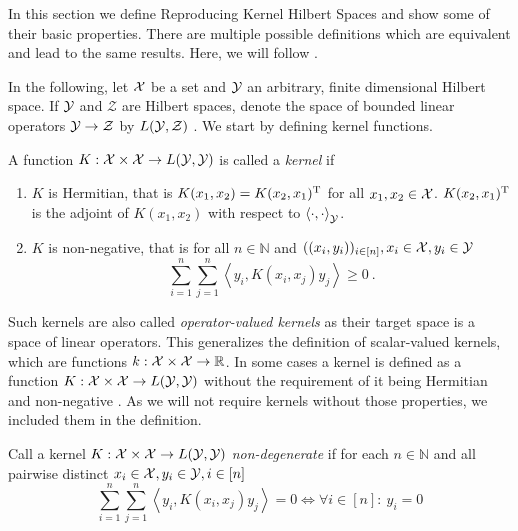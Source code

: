 In this section we define Reproducing Kernel Hilbert Spaces and show some of their basic properties.
There are multiple possible definitions which are equivalent and lead to the same results.
Here, we will follow \cite{owhadi20}.


In the following, let $\mathcal{X}$ be a set and $\mathcal{Y}$ an arbitrary, finite dimensional Hilbert space.
If $\mathcal{Y}$ and $\mathcal{Z}$ are Hilbert spaces, denote the space of bounded linear operators $\mathcal{Y} \rightarrow \mathcal{Z}$ by $L(\mathcal{Y}, \mathcal{Z})$ .
We start by defining kernel functions.
\begin{definition}
	\label{def:kernel}
	A function $K: \mathcal{X} \times \mathcal{X} \rightarrow L(\mathcal{Y}, \mathcal{Y})$ is called a \emph{kernel} if
	\begin{enumerate}
		\item $K$ is Hermitian, that is $K(x_1, x_2) = K(x_2, x_1)^{\mathrm{T}}$ for all $x_1, x_2 \in \mathcal{X}$. 
		$K(x_2, x_1)^{\mathrm{T}}$ is the adjoint of $K(x_1, x_2)$ with respect to $\left<\cdot, \cdot\right>_{\mathcal{Y}}$.
		\item $K$ is non-negative, that is for all $n \in \mathbb{N}$ and $((x_i, y_i))_{i \in [n]}, x_i \in \mathcal{X}, y_i \in \mathcal{Y}$
		\begin{equation}
			\sum_{i=1}^n \sum_{j=1}^n \left< y_i, K(x_i, x_j)  y_j\right> \geq 0 \ .
		\end{equation}
	\end{enumerate}
\end{definition}

Such kernels are also called \emph{operator-valued kernels} as their target space is a space of linear operators.
This generalizes the definition of scalar-valued kernels, which are functions $k: \mathcal{X} \times \mathcal{X} \rightarrow \mathbb{R}$.
In some cases a kernel is defined as a function $K: \mathcal{X} \times \mathcal{X} \rightarrow L(\mathcal{Y}, \mathcal{Y})$ without the requirement of it being Hermitian and non-negative \cite{sejdinovic12}.
As we will not require kernels without those properties, we included them in the definition.

\begin{definition}
	Call a kernel $K: \mathcal{X} \times \mathcal{X} \rightarrow L(\mathcal{Y}, \mathcal{Y})$ \emph{non-degenerate} if for each $n \in \mathbb{N}$ and all pairwise distinct $x_i \in \mathcal{X}, y_i \in \mathcal{Y}, i \in [n]$
	\begin{equation}
		\sum_{i=1}^n \sum_{j=1}^n \left< y_i, K(x_i, x_j)  y_j\right> = 0 \Leftrightarrow \forall i \in [n]:~ y_i = 0
	\end{equation}
\end{definition}


